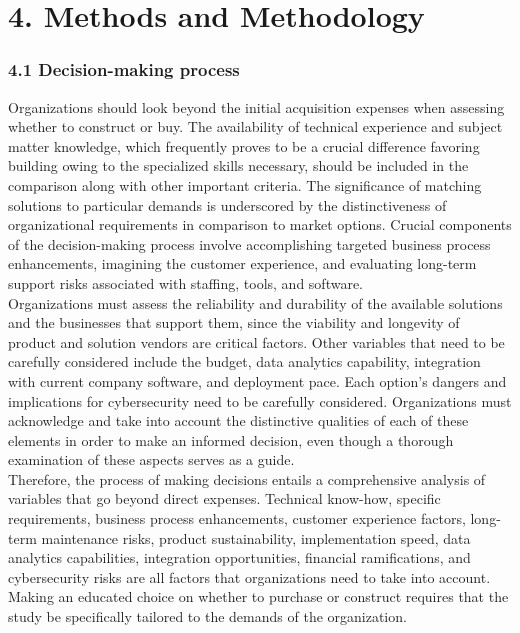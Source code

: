 \documentclass[letterpaper, 11pt]{report}
\begin{document}
{}
\section*{4. Methods and Methodology}
\subsubsection*{4.1 Decision-making process}
\normalsize{Organizations should look beyond the initial acquisition expenses when assessing whether to construct or buy. The availability of technical experience and subject matter knowledge, which frequently proves to be a crucial difference favoring building owing to the specialized skills necessary, should be included in the comparison along with other important criteria. The significance of matching solutions to particular demands is underscored by the distinctiveness of organizational requirements in comparison to market options. Crucial components of the decision-making process involve accomplishing targeted business process enhancements, imagining the customer experience, and evaluating long-term support risks associated with staffing, tools, and software.\\

Organizations must assess the reliability and durability of the available solutions and the businesses that support them, since the viability and longevity of product and solution vendors are critical factors. Other variables that need to be carefully considered include the budget, data analytics capability, integration with current company software, and deployment pace. Each option's dangers and implications for cybersecurity need to be carefully considered. Organizations must acknowledge and take into account the distinctive qualities of each of these elements in order to make an informed decision, even though a thorough examination of these aspects serves as a guide.\\

Therefore, the process of making decisions entails a comprehensive analysis of variables that go beyond direct expenses. Technical know-how, specific requirements, business process enhancements, customer experience factors, long-term maintenance risks, product sustainability, implementation speed, data analytics capabilities, integration opportunities, financial ramifications, and cybersecurity risks are all factors that organizations need to take into account. Making an educated choice on whether to purchase or construct requires that the study be specifically tailored to the demands of the organization.\\
}
\end{document}
